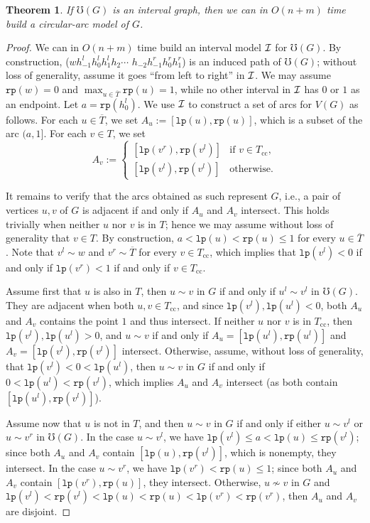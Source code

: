 \documentclass[10pt]{article}
\newtheorem{theorem}{Theorem}[section]
\newcommand{\lp}[1]{\ensuremath{{\mathtt{lp}(#1)}}}
\newcommand{\rp}[1]{\ensuremath{{\mathtt{rp}(#1)}}}
\newcommand{\oo}{\ensuremath{T}}
\newcommand{\occ}{\ensuremath{T_{\text{cc}}}}
\begin{document}
\begin{theorem}\label{lem:build-ca-model}
  If $\mho(G)$ is an interval graph, then we can in $O(n+m)$ time
  build a circular-arc model of $G$.
\end{theorem}
\begin{proof}
  We can in $O(n+m)$ time build an interval model $\cal I$ for
  $\mho(G)$.  By construction, ($w h_{-1}^l h_0^l h_1^l h_2 \cdots$
  $h_{-2} h_{-1}^r h_0^r h_1^r$) is an induced path of $\mho(G)$;
  without loss of generality, assume it goes ``from left to right'' in
  $\cal I$.  We may assume $\rp{w} = 0$ and $\max_{u\in
    \overline{\oo}}\rp{u} = 1$, while no other interval in $\cal I$
  has $0$ or $1$ as an endpoint.  Let $a = \rp{h_0^l}$.  We use $\cal
  I$ to construct a set of arcs for $V(G)$ as follows.  For each $u\in
  \overline{\oo}$, we set $A_u := [\lp{u}, \rp{u} ]$, which is a
  subset of the arc $(a,1]$.  For each $v\in \oo$, we set
  \begin{equation*}
    \label{eq:arcs}A_v := 
    \begin{cases}
      [\lp{v^r}, \rp{v^l} ] & \text{if } v\in\occ,
      \\
      [\lp{v^l}, \rp{v^l} ] & \text{otherwise}.
    \end{cases}
  \end{equation*}

  It remains to verify that the arcs obtained as such represent $G$,
  i.e., a pair of vertices $u, v$ of $G$ is adjacent if and only if
  $A_u$ and $A_v$ intersect.  This holds trivially when neither $u$
  nor $v$ is in $\oo$; hence we may assume without loss of generality
  that $v\in \oo$.  By construction, $a< \lp{u}<\rp{u}\le 1$ for every
  $u\in \overline{\oo}$.  Note that $v^l\sim w$ and $v^r\sim
  \overline{\oo}$ for every $v\in \occ$, which implies that $\lp{v^l}<
  0$ if and only if $\lp{v^r}< 1$ if and only if $v\in \occ$.

  Assume first that $u$ is also in $\oo$, then $u\sim v$ in $G$ if and
  only if $u^l\sim v^l$ in $\mho(G)$.  They are adjacent when both
  $u,v\in\occ$, and since $\lp{v^l}, \lp{u^l}< 0$, both $A_u$ and
  $A_v$ contains the point $1$ and thus intersect.  If neither $u$ nor
  $v$ is in $\occ$, then $\lp{v^l}, \lp{u^l}> 0$, and $u\sim v$ if and
  only if $A_u = [\lp{u^l}, \rp{u^l}]$ and $A_v = [\lp{v^l},
  \rp{v^l}]$ intersect.  Otherwise, assume, without loss of
  generality, that $\lp{v^l} < 0 < \lp{u^l}$, then $u\sim v$ in $G$ if
  and only if $0 < \lp{u^l} < \rp{v^l}$, which implies $A_u$ and $A_v$
  intersect (as both contain $[\lp{u^l}, \rp{v^l}]$).

  Assume now that $u$ is not in $\oo$, and then $u\sim v$ in $G$ if
  and only if either $u\sim v^l$ or $u\sim v^r$ in $\mho(G)$.  In the
  case $u\sim v^l$, we have $\lp{v^l} \le a < \lp{u}\le \rp{v^l}$;
  since both $A_u$ and $A_v$ contain $[\lp{u}, \rp{v^l}]$, which is
  nonempty, they intersect.  In the case $u\sim v^r$, we have
  $\lp{v^r}< \rp{u} \le 1$; since both $A_u$ and $A_v$ contain
  $[\lp{v^r}, \rp{u}]$, they intersect.  Otherwise, $u\not\sim v$ in
  $G$ and $\lp{v^l} < \rp{v^l} < \lp{u} < \rp{u} < \lp{v^r} <
  \rp{v^r}$, then $A_u$ and $A_v$ are disjoint.
\end{proof}
\end{document}
